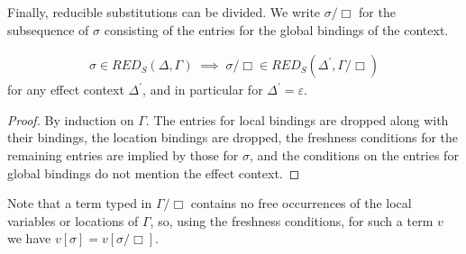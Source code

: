 \documentclass[acmsmall, screen, review, anonymous]{acmart}
\theoremstyle{definition}
\newcommand{\cempty}{\varepsilon}
\newcommand{\cdiv}[1]{#1/\Box}
\newcommand{\redname}{RED}
\newcommand{\redsname}{\redname_{S}}
\newcommand{\reds}[2]{\redsname{({#1},{#2})}}
\begin{document}
Finally, reducible substitutions can be divided. We write
$\cdiv{\sigma}$ for the subsequence of $\sigma$ consisting of the
entries for the global bindings of the context.
\begin{lemma}
\label{lemma:red-subst-cdiv}
\begin{align*}
  \sigma \in \reds{\Delta}{\Gamma}
  \; \implies \;
  \cdiv{\sigma} \in \reds{\Delta^{\prime}}{\cdiv{\Gamma}}
\end{align*}
for any effect context $\Delta^{\prime}$, and in particular for
$\Delta^{\prime} = \cempty$.
\end{lemma}
\begin{proof}
  By induction on $\Gamma$. The entries for local bindings are dropped
  along with their bindings, the location bindings are dropped, the
  freshness conditions for the remaining entries are implied by those
  for $\sigma$, and the conditions on the entries for global bindings
  do not mention the effect context.
\end{proof}
Note that a term typed in $\cdiv{\Gamma}$ contains no free occurrences
of the local variables or locations of $\Gamma$, so, using the
freshness conditions, for such a term $v$ we have
$v[\sigma] = v[\cdiv{\sigma}]$.
\end{document}
